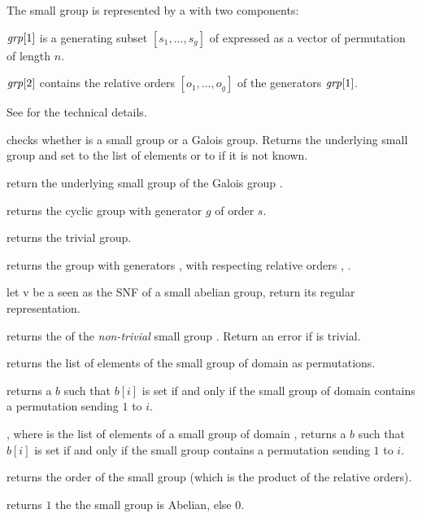 The small group  is represented by a  with two
components:

$\hbox{\it grp\/}[1]$ is a generating subset $[s_1,\ldots,s_g]$ of 
expressed as a vector of permutation of length $n$.

$\hbox{\it grp\/}[2]$ contains the relative orders $[o_1,\ldots,o_g]$ of
the generators $\hbox{\it grp\/}[1]$.

See  for the technical details.

 checks whether  is a
small group or a Galois group. Returns the underlying small
group and set  to the list of elements or to  if it is not
known.

 return the underlying small group of the
Galois group .

 returns the cyclic group with generator
$g$ of order $s$.

 returns the trivial group.

 returns the group
with generators ,  with respecting relative orders ,
.

 let v be a  seen as the SNF of
a small abelian group, return its regular representation.

 returns the  of the
\emph{non-trivial} small group . Return an error if  is
trivial.

 returns the list of elements of the
small group  of domain  as permutations.

 returns a  $b$ such that
$b[i]$ is set if and only if the small group  of domain 
contains a permutation sending $1$ to $i$.

, where  is the list of
elements of a small group of domain , returns a  $b$ such that
$b[i]$ is set if and only if the small group contains a permutation sending $1$
to $i$.

 returns the order of the small group
 (which is the product of the relative orders).

 returns $1$ the the small group
 is Abelian, else $0$.

